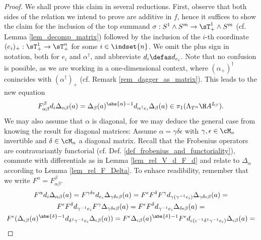 \begin{proof}
We shall prove this claim in several reductions. First, observe that both sides of the relation we intend to prove are additive in $f$, hence it suffices to show the claim for the inclusion of the top summand $\sigma: S^1 \wedge S^m \to \sT^1_+ \wedge S^m$ (cf. Lemma \ref{lem_decomp_matrix}) followed by the inclusion of the $i$-th coordinate $(e_i)_+: \sT^1_+ \to \sT^n_+$ for some $i \in \indset{n}$. We omit the plus sign in notation, both for $e_i$ and $\alpha^\dagger$, and abbreviate $d_i \defas d_{e_i}$. Note that no confusion is possible, as we are working in a one-dimensional context, where $(\alpha_+)^\dagger$ conincides with $(\alpha^\dagger)_+$ (cf. Remark \ref{rem_dagger_as_matrix}). %
This leads to the new equation
\[ F_{\alpha\beta}^\beta d_i \Delta_{\alpha\beta} (a) =%
  \Delta_{\beta} (a)^{\abs{\alpha} - 1} d_{\alpha^\dagger e_i} \Delta_{\beta}(a)%
  \in \pi_1 (\Lambda_{T^n} \H A ^{L_\beta}).%
	\]
We may also assume that $\alpha$ is diagonal, for we may deduce the general case from knowing the result for diagonal matrices: Assume $\alpha = \gamma \delta \epsilon$ with $\gamma, \epsilon \in \cM_n$ invertible and $\delta \in \cM_n$ a diagonal matrix. Recall that the Frobenius operators are contravariantly functorial (cf. Def. \ref{def_frobenius_and_functoriality}), commute with differentials as in Lemma \ref{lem_rel_V_d_F_d} and relate to $\Delta_\alpha$ according to Lemma \ref{lem_rel_F_Delta}. To enhace readibility, remember that we write $F^\alpha = F_{\alpha\beta}^\beta$.
\begin{gather}\label{eq_Fdw_reduction_diagonal_alpha}
	\nonumber %
	F^{\alpha} d_i \Delta_{\alpha \beta} (a) = %
	F^{\gamma\delta\epsilon} d_{e_i} \Delta_{\gamma\delta\epsilon\beta} (a) = %
	F^{\epsilon} F^{\delta} F^{\gamma} d_{\gamma (\gamma^{-1} e_i)}%
		\Delta_{\gamma\delta\epsilon\beta} (a) = %
		\\%
	\nonumber %
	F^{\epsilon} F^{\delta} d_{\gamma^{-1} e_i} F^{\gamma} %
		\Delta_{\gamma\delta\epsilon\beta} (a) = %
	F^{\epsilon} F^{\delta} d_{\gamma^{-1} e_i} \Delta_{\delta\epsilon\beta} (a) =%
		\\%
	\nonumber %
	F^{\epsilon} ( \Delta_{\epsilon\beta} (a)^{\abs{\delta}-1}%
		d_{\delta^\dagger \gamma^{-1} e_i} \Delta_{\epsilon\beta}(a) ) = %
	F^{\epsilon} \Delta_{\epsilon\beta} (a)^{\abs{\delta}-1}%
		F^{\epsilon} d_{\epsilon( \epsilon^{-1} \delta^\dagger \gamma^{-1} e_i )}%
		\Delta_{\epsilon\beta}(a) = %

\end{gather}
\end{proof}
